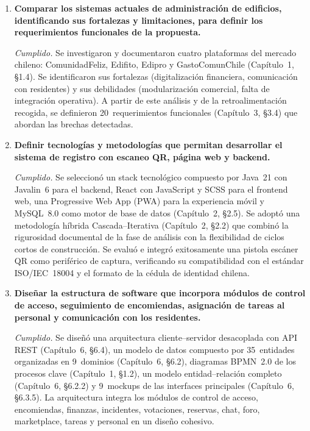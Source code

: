 \begin{enumerate}
    \item \textbf{Comparar los sistemas actuales de administración de edificios, identificando sus fortalezas y limitaciones, para definir los requerimientos funcionales de la propuesta.}

    \textit{Cumplido.} Se investigaron y documentaron cuatro plataformas del mercado chileno: ComunidadFeliz, Edifito, Edipro y GastoComunChile (Capítulo~1, §1.4). Se identificaron sus fortalezas (digitalización financiera, comunicación con residentes) y sus debilidades (modularización comercial, falta de integración operativa). A partir de este análisis y de la retroalimentación recogida, se definieron 20~requerimientos funcionales (Capítulo~3, §3.4) que abordan las brechas detectadas.

    \item \textbf{Definir tecnologías y metodologías que permitan desarrollar el sistema de registro con escaneo QR, página web y backend.}

    \textit{Cumplido.} Se seleccionó un stack tecnológico compuesto por Java~21 con Javalin~6 para el backend, React con JavaScript y SCSS para el frontend web, una Progressive Web App (PWA) para la experiencia móvil y MySQL~8.0 como motor de base de datos (Capítulo~2, §2.5). Se adoptó una metodología híbrida Cascada--Iterativa (Capítulo~2, §2.2) que combinó la rigurosidad documental de la fase de análisis con la flexibilidad de ciclos cortos de construcción. Se evaluó e integró exitosamente una pistola escáner QR como periférico de captura, verificando su compatibilidad con el estándar ISO/IEC~18004 y el formato de la cédula de identidad chilena.

    \item \textbf{Diseñar la estructura de software que incorpora módulos de control de acceso, seguimiento de encomiendas, asignación de tareas al personal y comunicación con los residentes.}

    \textit{Cumplido.} Se diseñó una arquitectura cliente--servidor desacoplada con API REST (Capítulo~6, §6.4), un modelo de datos compuesto por 35~entidades organizadas en 9~dominios (Capítulo~6, §6.2), diagramas BPMN~2.0 de los procesos clave (Capítulo~1, §1.2), un modelo entidad--relación completo (Capítulo~6, §6.2.2) y 9~mockups de las interfaces principales (Capítulo~6, §6.3.5). La arquitectura integra los módulos de control de acceso, encomiendas, finanzas, incidentes, votaciones, reservas, chat, foro, marketplace, tareas y personal en un diseño cohesivo.


\end{enumerate}
